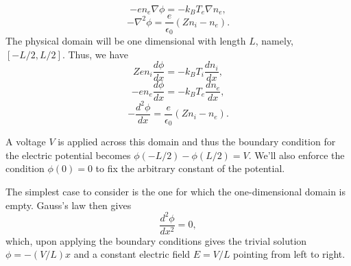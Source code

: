\documentclass[a4paper,11pt]{report}
\begin{document}
\begin{equation*}
    -en_e \nabla \phi = -k_B T_e \nabla n_e,
\end{equation*}
\begin{equation*}
    -\nabla^2 \phi = \frac{e}{\epsilon_0} (Zn_i - n_e).
\end{equation*}
The physical domain will be one dimensional with length $L$, namely, $[-L/2,L/2]$. Thus, we have
\begin{equation}
    \label{eq:debye_ode_ni}
    Zen_i \frac{d\phi}{dx} = -k_B T_i \frac{dn_i}{dx},
\end{equation}
\begin{equation}
    \label{eq:debye_ode_ne}
    -en_e \frac{d\phi}{dx} = -k_B T_e \frac{dn_e}{dx},
\end{equation}
\begin{equation}
    \label{eq:debye_ode_phi}
    -\frac{d^2\phi}{dx} = \frac{e}{\epsilon_0} (Zn_i - n_e).
\end{equation}

A voltage $V$ is applied across this domain and thus the boundary condition for the electric potential becomes $\phi(-L/2) - \phi(L/2) = V$. We'll also enforce the condition $\phi(0) = 0$ to fix the arbitrary constant of the potential. 

The simplest case to consider is the one for which the one-dimensional domain is empty. Gauss's law then gives
\begin{equation*}
    \frac{d^2 \phi}{dx^2} = 0,
\end{equation*}
which, upon applying the boundary conditions gives the trivial solution $\phi = -(V/L) x$ and a constant electric field $E=V/L$ pointing from left to right.
\end{document}
